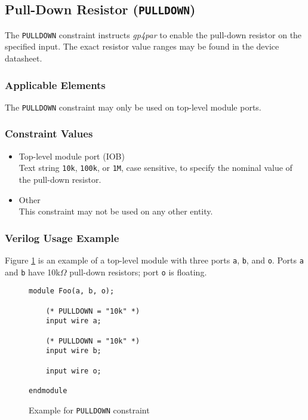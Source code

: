 \documentclass[11pt]{article}
\newcommand{\namestyle}[1]{\textit{#1}}
\newcommand{\tokenstyle}[1]{\texttt{#1}}
\newcommand{\wirestyle}[1]{\texttt{#1}}
\newcommand{\valuestyle}[1]{\texttt{#1}}
\newcommand{\strvaluestyle}[1]{\valuestyle{\textquotedbl#1\textquotedbl}}
\newcommand{\whenstyle}[1]{{\fontseries{sb}\selectfont#1}}
\begin{document}

\clearpage
\pagebreak
\subsection{Pull-Down Resistor (\tokenstyle{PULLDOWN})}

The \tokenstyle{PULLDOWN} constraint instructs \namestyle{gp4par} to enable the pull-down resistor on the specified input. The exact resistor
value ranges may be found in the device datasheet.

\subsubsection{Applicable Elements}
The \tokenstyle{PULLDOWN} constraint may only be used on top-level module ports.

\subsubsection{Constraint Values}
\begin{itemize}
\item \whenstyle{Top-level module port (IOB)}\\
Text string \strvaluestyle{10k}, \strvaluestyle{100k}, or \strvaluestyle{1M}, case sensitive, to specify the nominal value of the pull-down resistor.
\item \whenstyle{Other} \\
This constraint may not be used on any other entity.
\end{itemize}

\subsubsection{Verilog Usage Example}

Figure \ref{constraint-pulldown} is an example of a top-level module with three ports \wirestyle{a}, \wirestyle{b}, and
\wirestyle{o}. Ports \wirestyle{a} and \wirestyle{b} have 10k$\Omega$ pull-down resistors; port \wirestyle{o} is floating.

\begin{figure}[h]
\begin{lstlisting}
module Foo(a, b, o);

	(* PULLDOWN = "10k" *)
	input wire a;

	(* PULLDOWN = "10k" *)
	input wire b;

	input wire o;

endmodule
\end{lstlisting}
\caption{Example for \tokenstyle{PULLDOWN} constraint}
\label{constraint-pulldown}
\end{figure}
\end{document}
